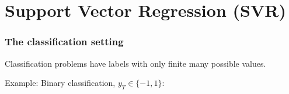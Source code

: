 \section{Support Vector Regression (SVR)}


\begin{frame}\frametitle{The classification setting}


Classification problems have labels with only finite many possible values.

Example: Binary classification, $y_{T} \in \{-1,1\}$:


\end{frame}
